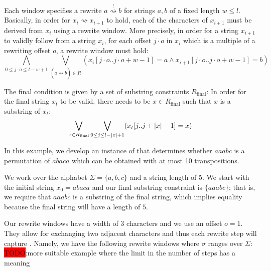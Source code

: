 \documentclass[a4paper,UKenglish,cleveref, autoref]{lipics-v2019}
\newcommand{\TODO}[1]{\colorbox{red}{\LARGE TODO}:#1}
\newcommand{\strent}{\rightsquigarrow}
\newcommand{\constrent}{\overset{!}{\rightsquigarrow}}
\newcommand{\Rfinal}{R_{\text{final}}}
\begin{document}
Each window specifies a rewrite $a \constrent b$ for strings $a, b$ of a fixed length $w \le l$. Basically, in order for $x_i \strent x_{i+1}$ to hold, each of the characters of $x_{i+1}$ must be derived from $x_i$ using a rewrite window.
More precisely, in order for a string $x_{i+1}$ to validly follow from a string $x_i$, for each offset $j \cdot o$ in $x_i$ which is a multiple of a rewriting offset $o$, a rewrite window must hold:
\[\bigwedge_{0 \le j\cdot o \le l - w + 1} \bigvee_{(a \constrent b) \in R} (x_i[j\cdot o..j\cdot o+w-1] = a \land x_{i+1}[j\cdot o..j\cdot o+w-1] = b) \]

The final condition is given by a set of substring constraints $\Rfinal$: In order for the final string $x_t$ to be valid, there needs to be $x \in \Rfinal$ such that $x$ is a substring of $x_t$:
\[\bigvee_{x \in \Rfinal} \bigvee_{0 \le j \le l - \length{x} + 1} (x_t[j..j+\length{x} -1] = x) \]

\newcommand*{\validR}{\textsf{valid}}

\begin{example}
  In this example, we develop an instance of \strconrew{} that determines whether $aaabc$ is a permutation of $abaca$ which can be obtained with at most 10 transpositions. 

  We work over the alphabet $\Sigma = \{a, b, c\}$ and a string length of $5$. We start with the initial string $x_0=abaca$ and our final substring constraint is $\{aaabc\}$; that is, we require that $aaabc$ is a substring of the final string, which implies equality because the final string will have a length of $5$.

  Our rewrite windows have a width of 3 characters and we use an offset $o =1$. They allow for exchanging two adjacent characters and thus each rewrite step will capture . Namely, we have the following rewrite windows where $\sigma$ ranges over $\Sigma$:
  \TODO{more suitable example where the limit in the number of steps has a meaning}
\end{example}
    
\end{document}

